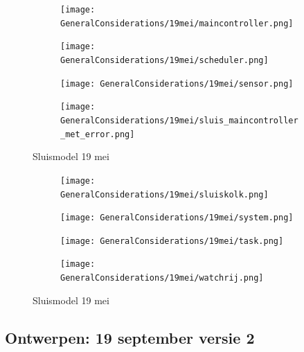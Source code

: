 \documentclass{article}
\begin{document}
	\begin{figure}
		\centering
		\begin{subfigure}{0.45\linewidth}
			\texttt{[image: GeneralConsiderations/19mei/maincontroller.png]}
			\caption{}
			\label{fig:1a}
		\end{subfigure}\hfill
		\begin{subfigure}{0.45\linewidth}
			\texttt{[image: GeneralConsiderations/19mei/scheduler.png]}
			\caption{}
			\label{fig:1a}
		\end{subfigure}
		
		\begin{subfigure}{0.45\linewidth}
			\texttt{[image: GeneralConsiderations/19mei/sensor.png]}
			\caption{}
			\label{fig:1a}
		\end{subfigure}\hfill
		\begin{subfigure}{0.45\linewidth}
			\texttt{[image: GeneralConsiderations/19mei/sluis\_maincontroller\_met\_error.png]}
			\caption{}
			\label{fig:1a}
		\end{subfigure}
		\caption{Sluismodel 19 mei}
		\label{fig:1}
	\end{figure}
	
	\begin{figure}
		\centering
		\begin{subfigure}{0.45\linewidth}
			\texttt{[image: GeneralConsiderations/19mei/sluiskolk.png]}
			\caption{}
			\label{fig:1a}
		\end{subfigure}\hfill
		\begin{subfigure}{0.45\linewidth}
			\texttt{[image: GeneralConsiderations/19mei/system.png]}
			\caption{}
			\label{fig:1a}
		\end{subfigure}
		
		\begin{subfigure}{0.45\linewidth}
			\texttt{[image: GeneralConsiderations/19mei/task.png]}
			\caption{}
			\label{fig:1a}
		\end{subfigure}\hfill
		\begin{subfigure}{0.45\linewidth}
			\texttt{[image: GeneralConsiderations/19mei/watchrij.png]}
			\caption{}
			\label{fig:1a}
		\end{subfigure}
		\caption{Sluismodel 19 mei}
		\label{fig:1}
	\end{figure}
	
	\newpage
	\subsection{Ontwerpen:  19 september versie 2}
	
\end{document}
